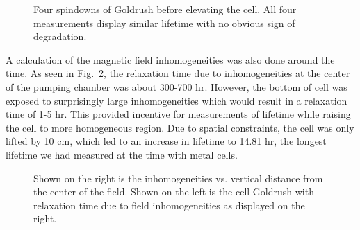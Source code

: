 \begin{figure}[t!]
	\centering
	\caption{{Four spindowns of Goldrush before elevating the cell. All four measurements display similar lifetime with no obvious sign of degradation.}}
	\label{goldrush}
\end{figure}

A calculation of the magnetic field inhomogeneities was also done around the time. As seen in Fig.~\ref{goldrush_inhomogeneities}, the relaxation time due to inhomogeneities at the center of the pumping chamber was about 300-700 hr. However, the bottom of cell was exposed to surprisingly large inhomogeneities which would result in a relaxation time of 1-5 hr. This provided incentive for measurements of lifetime while raising the cell to more homogeneous region. Due to spatial constraints, the cell was only lifted by 10 cm, which led to an increase in lifetime to 14.81 hr, the longest lifetime we had measured at the time with metal cells.

\begin{figure}[t!]
	\centering
	\caption{{Shown on the right is the inhomogeneities vs. vertical distance from the center of the field. Shown on the left is the cell Goldrush with relaxation time due to field inhomogeneities as displayed on the right.}}
	\label{goldrush_inhomogeneities}
\end{figure}

